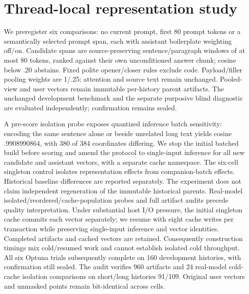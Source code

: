 \documentclass[11pt]{article}
\begin{document}
\section{Thread-local representation study}
We preregister six comparisons: no current prompt, first 80 prompt tokens or a
semantically selected prompt span, each with assistant boilerplate weighting
off/on. Candidate spans are source-preserving sentence/paragraph windows of at
most 80 tokens, ranked against their own unconditioned answer chunk; cosine
below .20 abstains. Fixed polite opener/closer rules exclude code. Payload/filler
pooling weights are 1/.25; attention and source text remain unchanged.
Pooled-view and user vectors remain immutable per-history parent artifacts.
The unchanged development benchmark and the separate purposive blind diagnostic
are evaluated independently; confirmation remains sealed.

A pre-score isolation probe exposes quantized inference batch sensitivity:
encoding the same sentence alone or beside unrelated long text yields cosine
.9908990864, with 380 of 384 coordinates differing. We stop the initial batched
build before scoring and amend the protocol to single-input inference for all
new candidate and assistant vectors, with a separate cache namespace. The
six-cell singleton control isolates representation effects from companion-batch
effects. Historical baseline differences are reported separately. The experiment
does not claim independent regeneration of the immutable historical parents.
Real-model isolated/reordered/cache-population probes and full artifact audits
precede quality interpretation. Under substantial host I/O pressure, the initial
singleton cache commits each vector separately; we resume with eight cache
writes per transaction while preserving single-input inference and vector
identities. Completed artifacts and cached vectors are retained. Consequently
construction timings mix cold/resumed work and cannot establish isolated cold
throughput. All six Optuna trials subsequently complete on 160 development
histories, with confirmation still sealed. The audit verifies 960 artifacts and
24 real-model cold-cache isolation comparisons on short/long histories 91/109.
Original user vectors and unmasked points remain bit-identical across cells.
\end{document}
